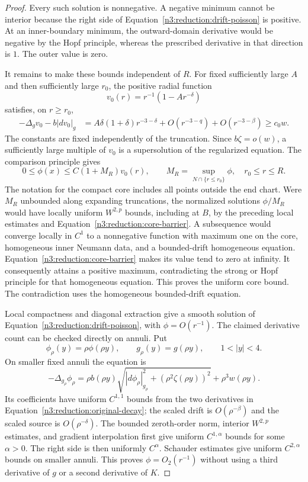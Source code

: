 \begin{proof}
Every such solution is nonnegative.  A negative minimum cannot be
interior because the right side of
Equation~\eqref{n3:reduction:drift-poisson} is positive.  At an inner-boundary
minimum, the outward-domain derivative would be negative by the Hopf
principle, whereas the prescribed derivative in that direction is $1$.
The outer value is zero.

It remains to make these bounds independent of $R$.  For fixed sufficiently large
$A$ and then sufficiently large $r_0$, the positive radial function
\[
 v_0(r)=r^{-1}(1-Ar^{-\delta})
\]
satisfies, on $r\ge r_0$,
\begin{align*}
 -\Delta_gv_0-b|dv_0|_g
 &=A\delta(1+\delta)r^{-3-\delta}
       +O(r^{-3-q})+O(r^{-3-\beta})\ge c_0w.
\end{align*}
The constants are fixed independently of the truncation.  Since
$b\zeta=o(w)$, a sufficiently large multiple of $v_0$ is a supersolution
of the regularized equation.  The comparison principle gives
\begin{equation}
 \label{n3:reduction:core-barrier}
 0\le\phi(x)\le C(1+M_R)v_0(r),\qquad
 M_R=\sup_{N\cap\{r\le r_0\}}\phi,
 \quad r_0\le r\le R.
\end{equation}
The notation for the compact core includes all points outside the end
chart.  Were $M_R$ unbounded along expanding truncations, the normalized
solutions $\phi/M_R$ would have locally uniform $W^{2,p}$ bounds, including
at $B$, by the preceding local estimates and
Equation~\eqref{n3:reduction:core-barrier}.  A subsequence would converge
locally in $C^1$ to a nonnegative function with maximum one on the core,
homogeneous inner Neumann data, and a bounded-drift homogeneous equation.
Equation~\eqref{n3:reduction:core-barrier} makes its value tend to zero at
infinity.  It consequently attains a positive maximum, contradicting the
strong or Hopf principle for that homogeneous equation.  This proves the
uniform core bound.  The contradiction uses the homogeneous bounded-drift
equation.

Local compactness and diagonal extraction give a smooth solution of
Equation~\eqref{n3:reduction:drift-poisson}, with $\phi=O(r^{-1})$.
The claimed derivative count can be checked directly on annuli.  Put
\[
 \phi_{\rho}(y)=\rho\phi(\rho y),\qquad
 g_{\rho}(y)=g(\rho y),\qquad 1<|y|<4.
\]
On smaller fixed annuli the equation is
\[
 -\Delta_{g_{\rho}}\phi_{\rho}
 =\rho b(\rho y)
       \sqrt{|d\phi_{\rho}|_{g_{\rho}}^2+
                     (\rho^2\zeta(\rho y))^2}
       +\rho^3w(\rho y).
\]
Its coefficients have uniform $C^{1,1}$ bounds from the two derivatives
in Equation~\eqref{n3:reduction:original-decay}; the scaled drift is
$O(\rho^{-\beta})$ and the scaled source is $O(\rho^{-\delta})$.
The bounded zeroth-order norm, interior $W^{2,p}$ estimates, and gradient
interpolation first give uniform $C^{1,\alpha}$ bounds for some
$\alpha>0$.  The right side is then uniformly $C^\alpha$.  Schauder
estimates give uniform $C^{2,\alpha}$ bounds on smaller annuli.  This
proves $\phi=O_2(r^{-1})$ without using a third derivative of $g$ or a
second derivative of $K$.


\end{proof}
